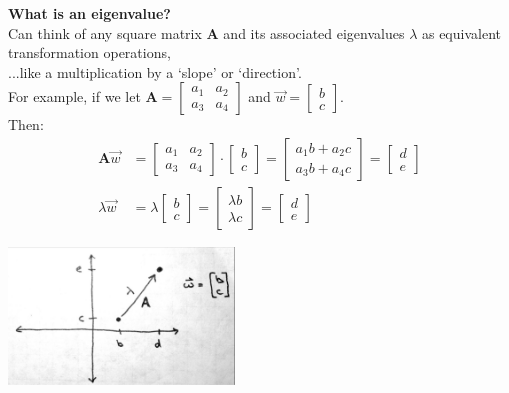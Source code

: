 \documentclass{article}
\newcommand{\ind}{\-\hspace{1cm}}
\begin{document}
\textbf{What is an eigenvalue?}\\
Can think of any square matrix $\mathbf{A}$ and its associated eigenvalues $\lambda$ as equivalent transformation operations,\\
\ind ...like a multiplication by a `slope' or `direction'.\\

For example,  if we let $\mathbf{A}  = \begin{bmatrix} a_1 & a_2 \\ a_3 & a_4 \end{bmatrix}$ and $\vec{w} = \begin{bmatrix}b \\ c \end{bmatrix}$.\\
Then:
\begin{align*}
	\mathbf{A} \vec{w} &= \begin{bmatrix} a_1 & a_2 \\ a_3 & a_4 \end{bmatrix} \cdot \begin{bmatrix} b \\ c\end{bmatrix} = \begin{bmatrix} a_1 b +  a_2 c \\ a_3 b + a_4 c \end{bmatrix} = \begin{bmatrix} d \\ e \end{bmatrix}\\
	\lambda \vec{w} &= \lambda \begin{bmatrix}b \\ c \end{bmatrix}=  \begin{bmatrix}\lambda b \\ \lambda c \end{bmatrix}  = \begin{bmatrix} d \\ e \end{bmatrix}
\end{align*}

\begin{center}
	\includegraphics[width=6cm]{figs/eigen1.pdf}
\end{center}
\end{document}

